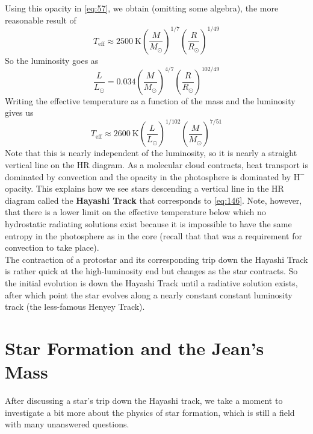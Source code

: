 \documentclass[10pt]{article}
\numberwithin{equation}{section}
\newcommand{\n}{\noindent}
\begin{document}
  Using this opacity in \eqref{eq:57}, we obtain (omitting some
  algebra), the more reasonable result of
  \begin{equation}
    \label{eq:144}
    T_{\mathrm{eff}}\approx 2500\ \mathrm{K}\left(\frac{M}{M_{\odot}}
\right)^{1/7}\left(\frac{R}{R_\odot}\right)^{1/49}
  \end{equation}
  So the luminosity goes as
  \begin{equation}
    \label{eq:145}
    \frac{L}{L_\odot}=0.034\left(\frac{M}{M_\odot}\right)^{4/7}\left(\frac
{R}{R_\odot}\right)^{102/49}
  \end{equation}
  Writing the effective temperature as a function of the mass and the
  luminosity gives us
  \begin{equation}
    \label{eq:146}
    T_{\mathrm{eff}}\approx 2600\ \mathrm{K}\left(\frac{L}{L_\odot}\right)^
{1/102}\left(\frac{M}{M_\odot}\right)^{7/51}
  \end{equation}
  Note that this is nearly independent of the luminosity, so it is
  nearly a straight vertical line on the HR diagram. As a molecular
  cloud contracts, heat transport is dominated by convection and the
  opacity in the photosphere is dominated by $\mathrm{H}^{-}$
  opacity. This explains how we see stars descending a vertical line
  in the HR diagram called the \textbf{Hayashi Track} that corresponds
  to \eqref{eq:146}. Note, however, that there is a lower limit on the
  effective temperature below which no hydrostatic radiating solutions
  exist because it is impossible to have the same entropy in the
  photosphere as in the core (recall that that was a requirement for
  convection to take place).\\

  \n The contraction of a protostar and its corresponding trip down
  the Hayashi Track is rather quick at the high-luminosity end but
  changes as the star contracts. So the initial evolution is down the
  Hayashi Track until a radiative solution exists, after which point
  the star evolves along a nearly constant constant luminosity track
  (the less-famous Henyey Track).

\section{Star Formation and the Jean's Mass}
\label{sec:star-formation-jeans}
After discussing a star's trip down the Hayashi track, we take a
moment to investigate a bit more about the physics of star formation,
which is still a field with many unanswered questions.
\end{document}
